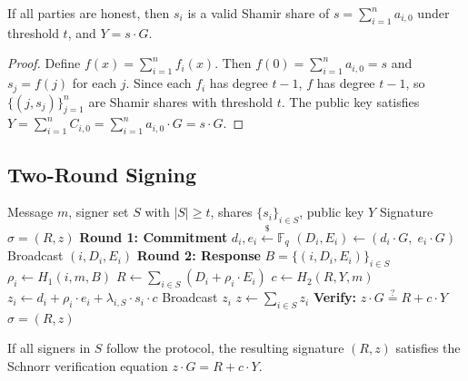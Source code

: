 \begin{lemma}
\label{lem:dkg-correct}
If all parties are honest, then $s_i$ is a valid Shamir share of
$s = \sum_{i=1}^n a_{i,0}$ under threshold $t$, and $Y = s \cdot G$.
\end{lemma}

\begin{proof}
Define $f(x) = \sum_{i=1}^n f_i(x)$. Then $f(0) = \sum_{i=1}^n a_{i,0} = s$ and
$s_j = f(j)$ for each $j$. Since each $f_i$ has degree $t-1$, $f$ has degree $t-1$,
so $\{(j, s_j)\}_{j=1}^n$ are Shamir shares with threshold $t$. The public key
satisfies $Y = \sum_{i=1}^n C_{i,0} = \sum_{i=1}^n a_{i,0} \cdot G = s \cdot G$.
\end{proof}

\subsection{Two-Round Signing}

\begin{algorithm}[H]
\caption{FROST Threshold Signing}
\label{alg:frost-sign}
\begin{algorithmic}[1]
\Require Message $m$, signer set $S$ with $|S| \geq t$, shares $\{s_i\}_{i \in S}$, public key $Y$
\Ensure Signature $\sigma = (R, z)$
\Statex \textbf{Round 1: Commitment}
  \State $d_i, e_i \xleftarrow{\$} \mathbb{F}_q$
  \State $(D_i, E_i) \gets (d_i \cdot G, \; e_i \cdot G)$
  \State Broadcast $(i, D_i, E_i)$
\EndFor
\Statex \textbf{Round 2: Response}
\State $B = \{(i, D_i, E_i)\}_{i \in S}$ 
  \State $\rho_i \gets H_1(i, m, B)$ 
\EndFor
\State $R \gets \sum_{i \in S} (D_i + \rho_i \cdot E_i)$
\State $c \gets H_2(R, Y, m)$ 
  \State $z_i \gets d_i + \rho_i \cdot e_i + \lambda_{i,S} \cdot s_i \cdot c$
  \State Broadcast $z_i$
\EndFor
\State $z \gets \sum_{i \in S} z_i$
\State \textbf{Verify:} $z \cdot G \stackrel{?}{=} R + c \cdot Y$
\State \Return $\sigma = (R, z)$
\end{algorithmic}
\end{algorithm}

\begin{theorem}
\label{thm:frost-correct}
If all signers in $S$ follow the protocol, the resulting signature $(R, z)$ satisfies
the Schnorr verification equation $z \cdot G = R + c \cdot Y$.
\end{theorem}

